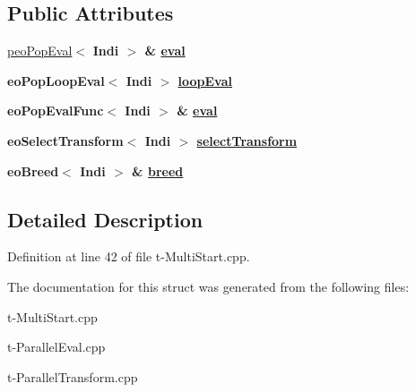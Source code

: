 \subsection*{Public Attributes}
\begin{CompactItemize}
\item 
\hypertarget{structAlgorithm_821b495425de3f7e59c82a6e70e6b1a4}{
\hyperlink{classpeoPopEval}{peo\-Pop\-Eval}$<$ \bf{Indi} $>$ \& \hyperlink{structAlgorithm_821b495425de3f7e59c82a6e70e6b1a4}{eval}}
\label{structAlgorithm_821b495425de3f7e59c82a6e70e6b1a4}

\item 
\hypertarget{structAlgorithm_6661e046164d9e7193c80687daccb204}{
\bf{eo\-Pop\-Loop\-Eval}$<$ \bf{Indi} $>$ \hyperlink{structAlgorithm_6661e046164d9e7193c80687daccb204}{loop\-Eval}}
\label{structAlgorithm_6661e046164d9e7193c80687daccb204}

\item 
\hypertarget{structAlgorithm_0c802f6edca4886f00a1ad12056009fd}{
\bf{eo\-Pop\-Eval\-Func}$<$ \bf{Indi} $>$ \& \hyperlink{structAlgorithm_0c802f6edca4886f00a1ad12056009fd}{eval}}
\label{structAlgorithm_0c802f6edca4886f00a1ad12056009fd}

\item 
\hypertarget{structAlgorithm_b9728e2d574592118591f74c1530df48}{
\bf{eo\-Select\-Transform}$<$ \bf{Indi} $>$ \hyperlink{structAlgorithm_b9728e2d574592118591f74c1530df48}{select\-Transform}}
\label{structAlgorithm_b9728e2d574592118591f74c1530df48}

\item 
\hypertarget{structAlgorithm_f2f4e47346140968544e52900dcca312}{
\bf{eo\-Breed}$<$ \bf{Indi} $>$ \& \hyperlink{structAlgorithm_f2f4e47346140968544e52900dcca312}{breed}}
\label{structAlgorithm_f2f4e47346140968544e52900dcca312}

\end{CompactItemize}


\subsection{Detailed Description}




Definition at line 42 of file t-Multi\-Start.cpp.

The documentation for this struct was generated from the following files:\begin{CompactItemize}
\item 
t-Multi\-Start.cpp\item 
t-Parallel\-Eval.cpp\item 
t-Parallel\-Transform.cpp\end{CompactItemize}
